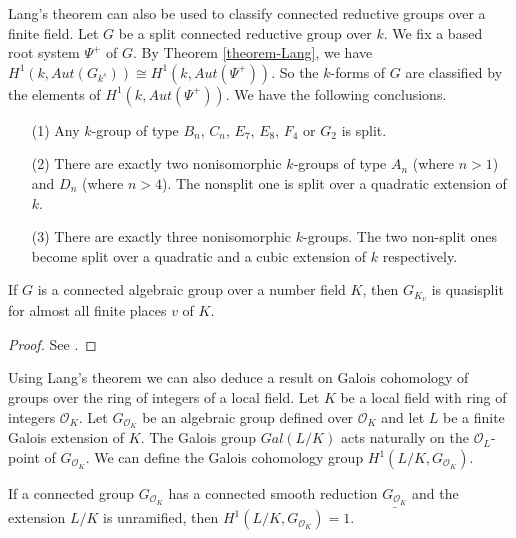 \begin{remark}
 \label{remark-classify-group-finite}
Lang's theorem can also be used to classify connected reductive groups over a finite field. Let $G$ be a split connected reductive group over $k$.  We fix a based root system $\Psi^{+}$ of $G$. By Theorem \ref{theorem-Lang}, we have $H^{1}(k, Aut (G_{k^{s}}))\cong H^{1}(k, Aut (\Psi^{+}))$. So the $k$-forms of $G$ are classified by the elements of $H^{1}(k, Aut(\Psi^{+}))$. We have the following conclusions.
\begin{enumerate}
\item[(1)] Any $k$-group of type $B_n$, $C_n$, $E_7$, $E_8$, $F_4$ or $G_2$ is split.
\item[(2)] There are exactly two nonisomorphic $k$-groups of type $A_n$ (where $n>1$) and $D_n$ (where $n>4$). The nonsplit one is split over a quadratic extension of $k$. 
\item[(3)] There are exactly three nonisomorphic $k$-groups. The two non-split ones become split over a quadratic and a cubic extension of $k$ respectively.
\end{enumerate}
\end{remark}


\begin{theorem}
 \label{theorem-almost-quasisplit}
If $G$ is a connected algebraic group over a number field $K$, then $G_{K_{v}}$ is quasisplit for almost all finite places $v$ of $K$.
\end{theorem}

\begin{proof}
See \cite[Theorem 6.7]{Platonov-Rapinchuk}.
\end{proof}

Using Lang's theorem we can also deduce a result on Galois cohomology of groups over the ring of integers of a local field. Let $K$ be a local field with ring of integers $\mathcal{O}_{K}$. Let $G_{\mathcal{O}_{K}}$ be an algebraic group defined over $\mathcal{O}_{K}$ and let $L$ be a finite Galois extension of $K$. The Galois group $Gal(L/K)$ acts naturally on the $\mathcal{O}_{L}$-point of $G_{\mathcal{O}_{K}}$. We can define the Galois cohomology group $H^{1}(L/K, G_{\mathcal{O}_{K}})$.
\begin{theorem}
 \label{theorem-unramified-cohomology}
If a connected group $G_{\mathcal{O}_{K}}$ has a connected smooth reduction $\underline{G_{\mathcal{O}_{K}}}$ and the extension $L/K$ is unramified, then $H^{1}(L/K, G_{\mathcal{O}_{K}})=1$.
\end{theorem}

